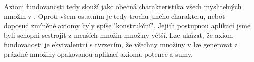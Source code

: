 Axiom fundovanosti tedy slouží jako obecná charakteristika všech myslitelných množin v \ZF. Oproti všem ostatním je tedy trochu jiného charakteru, neboť doposud zmíněné axiomy byly spíše "konstrukční". Jejich postupnou aplikací jsme byli schopni sestrojit z menších množin množiny větší. Lze ukázat, že axiom fundovanosti je ekvivalentní s tvrzením, že všechny množiny v \ZF lze generovat z prázdné množiny opakovanou aplikací axiomu potence a sumy.